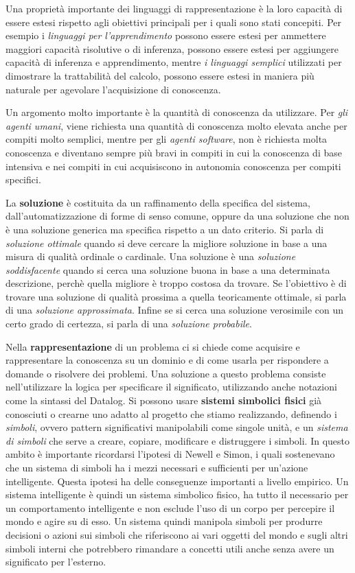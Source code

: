 \documentclass[a4paper]{extarticle}
\begin{document}
Una proprietà importante dei linguaggi di rappresentazione è la loro capacità di essere estesi rispetto agli obiettivi principali per i quali sono stati concepiti. Per esempio i \textit{linguaggi per l'apprendimento} possono essere estesi per ammettere maggiori capacità risolutive o di inferenza,  possono essere estesi per aggiungere capacità di inferenza e apprendimento, mentre \textit{i linguaggi semplici} utilizzati per dimostrare la trattabilità del calcolo, possono essere estesi in maniera più naturale per agevolare l'acquisizione di conoscenza.

Un argomento molto importante è la quantità di conoscenza da utilizzare. Per \textit{gli agenti umani}, viene richiesta una quantità di conoscenza molto elevata anche per compiti molto semplici, mentre per gli \textit{agenti software}, non è richiesta molta conoscenza e diventano sempre più bravi in compiti in cui la conoscenza di base intensiva e nei compiti in cui acquisiscono in autonomia conoscenza per compiti specifici.

La \textbf{soluzione} è costituita da un raffinamento della specifica del sistema, dall'automatizzazione di forme di senso comune, oppure da una soluzione che non è una soluzione generica ma specifica rispetto a un dato criterio. Si parla di \textit{soluzione ottimale} quando si deve cercare la migliore soluzione in base a una misura di qualità ordinale o cardinale. Una soluzione è una \textit{soluzione soddisfacente} quando si cerca una soluzione buona in base a una determinata descrizione, perchè quella migliore è troppo costosa da trovare. Se l'obiettivo è di trovare una soluzione di qualità prossima a quella teoricamente ottimale, si parla di una \textit{soluzione approssimata}. Infine se si cerca una soluzione verosimile con un certo grado di certezza, si parla di una \textit{soluzione probabile}.

Nella \textbf{rappresentazione} di un problema ci si chiede come acquisire e rappresentare la conoscenza su un dominio e di come usarla per rispondere a domande o risolvere dei problemi. Una soluzione a questo problema consiste nell'utilizzare la logica per specificare il significato, utilizzando anche notazioni come la sintassi del Datalog. Si possono usare \textbf{sistemi simbolici fisici} già conosciuti o crearne uno adatto al progetto che stiamo realizzando, definendo i \textit{simboli}, ovvero pattern significativi manipolabili come singole unità, e un \textit{sistema di simboli} che serve a creare, copiare, modificare e distruggere i simboli. 
In questo ambito è importante ricordarsi l'ipotesi di Newell e Simon, i quali sostenevano che un sistema di simboli ha i mezzi necessari e sufficienti per un'azione intelligente. Questa ipotesi ha delle conseguenze importanti a livello empirico. Un sistema intelligente è quindi un sistema simbolico fisico, ha tutto il necessario per un comportamento intelligente e non esclude l'uso di un corpo per percepire il mondo e agire su di esso. Un sistema quindi manipola simboli per produrre decisioni o azioni sui simboli che riferiscono ai vari oggetti del mondo e sugli altri simboli interni che potrebbero rimandare a concetti utili anche senza avere un significato per l'esterno. 
\end{document}
